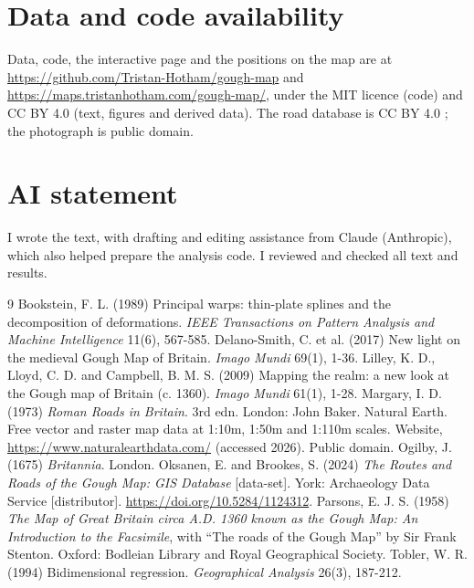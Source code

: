 \documentclass[11pt,a4paper]{article}
\begin{document}
\section*{Data and code availability}
Data, code, the interactive page and the positions on the map are at \url{https://github.com/Tristan-Hotham/gough-map} and \url{https://maps.tristanhotham.com/gough-map/}, under the MIT licence (code) and CC BY 4.0 (text, figures and derived data). The road database is CC BY 4.0 \citep{ads}; the photograph is public domain.

\section*{AI statement}
I wrote the text, with drafting and editing assistance from Claude (Anthropic), which also helped prepare the analysis code. I reviewed and checked all text and results.

\begin{thebibliography}{9}
 Bookstein, F. L. (1989) Principal warps: thin-plate splines and the decomposition of deformations. \emph{IEEE Transactions on Pattern Analysis and Machine Intelligence} 11(6), 567-585.
 Delano-Smith, C. et al. (2017) New light on the medieval Gough Map of Britain. \emph{Imago Mundi} 69(1), 1-36.
 Lilley, K. D., Lloyd, C. D. and Campbell, B. M. S. (2009) Mapping the realm: a new look at the Gough map of Britain (c. 1360). \emph{Imago Mundi} 61(1), 1-28.
 Margary, I. D. (1973) \emph{Roman Roads in Britain}. 3rd edn. London: John Baker.
 Natural Earth. Free vector and raster map data at 1:10m, 1:50m and 1:110m scales. Website, \url{https://www.naturalearthdata.com/} (accessed 2026). Public domain.
 Ogilby, J. (1675) \emph{Britannia}. London.
 Oksanen, E. and Brookes, S. (2024) \emph{The Routes and Roads of the Gough Map: GIS Database} [data-set]. York: Archaeology Data Service [distributor]. \url{https://doi.org/10.5284/1124312}.
 Parsons, E. J. S. (1958) \emph{The Map of Great Britain circa A.D. 1360 known as the Gough Map: An Introduction to the Facsimile}, with ``The roads of the Gough Map'' by Sir Frank Stenton. Oxford: Bodleian Library and Royal Geographical Society.
 Tobler, W. R. (1994) Bidimensional regression. \emph{Geographical Analysis} 26(3), 187-212.
\end{thebibliography}
\end{document}
